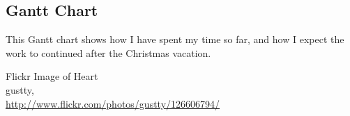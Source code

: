 \documentclass[12pt]{report}
\begin{document}
\pagebreak

\begin{landscape}

\section{Gantt Chart}
This Gantt chart shows how I have spent my time so far, and how I expect the
work to continued after the Christmas vacation.
\end{landscape}

\pagebreak

\printnomenclature

\pagebreak


\begin{thebibliography}{9}


	Flickr Image of Heart \\
	gustty,\\
	\url{http://www.flickr.com/photos/gustty/126606794/}


\end{thebibliography}
\end{document}
